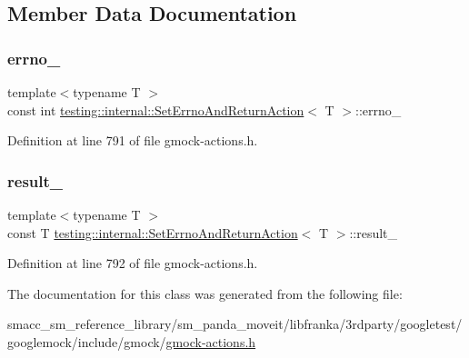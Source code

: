\subsection{Member Data Documentation}
\mbox{\label{classtesting_1_1internal_1_1SetErrnoAndReturnAction_ac4f5ce108de323f1f76654c38aa883a3}} 
\subsubsection{\texorpdfstring{errno\+\_\+}{errno\_}}
{\footnotesize\ttfamily template$<$typename T $>$ \\
const int \hyperlink{classtesting_1_1internal_1_1SetErrnoAndReturnAction}{testing\+::internal\+::\+Set\+Errno\+And\+Return\+Action}$<$ T $>$\+::errno\+\_\+\hspace{0.3cm}{\ttfamily [private]}}



Definition at line 791 of file gmock-\/actions.\+h.

\mbox{\label{classtesting_1_1internal_1_1SetErrnoAndReturnAction_a271f5a3b41aa3a7f06fbd69ad19b1c77}} 
\subsubsection{\texorpdfstring{result\+\_\+}{result\_}}
{\footnotesize\ttfamily template$<$typename T $>$ \\
const T \hyperlink{classtesting_1_1internal_1_1SetErrnoAndReturnAction}{testing\+::internal\+::\+Set\+Errno\+And\+Return\+Action}$<$ T $>$\+::result\+\_\+\hspace{0.3cm}{\ttfamily [private]}}



Definition at line 792 of file gmock-\/actions.\+h.



The documentation for this class was generated from the following file\+:\begin{DoxyCompactItemize}
\item 
smacc\+\_\+sm\+\_\+reference\+\_\+library/sm\+\_\+panda\+\_\+moveit/libfranka/3rdparty/googletest/googlemock/include/gmock/\hyperlink{gmock-actions_8h}{gmock-\/actions.\+h}\end{DoxyCompactItemize}
